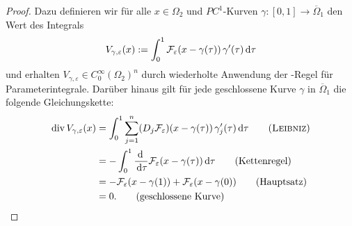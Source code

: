 \begin{proof}
  Dazu definieren wir für alle $x\in\Omega_2$ und $PC^1$\hyp{}Kurven $\gamma \colon [0,1] \to \overline\Omega_1$ den Wert des Integrals
  $$
  V_{\gamma,\varepsilon}(x) := \int_0^1 \mathcal{F}_\varepsilon(x - \gamma(\tau)) \, \gamma'(\tau)\, {\operatorname{d}\!{\tau}}
  $$
  und erhalten $V_{\gamma,\varepsilon} \in C_0^\infty(\Omega_2)^n$ durch wiederholte Anwendung der \leibniz\hyp{}Regel für Parameterintegrale.
  Darüber hinaus gilt für jede geschlossene Kurve $\gamma$ in $\overline\Omega_1$ die folgende Gleichungskette:
  \begingroup
  \addtolength{\jot}{0.5em}
  \begin{align*}
    \div V_{\gamma,\varepsilon}(x) 
    &= \int_0^1 \sum_{j=1}^n (D_j \mathcal{F}_\varepsilon)(x - \gamma(\tau)) \, \gamma_j'(\tau) \d\tau \tag{\leibniz}\\
    &= -\int_0^1 \frac{\d\ }{\d\tau}\mathcal{F}_\varepsilon(x - \gamma(\tau)) \d\tau \tag{Kettenregel}\\
    &= - \mathcal{F}_\varepsilon(x - \gamma(1)) + \mathcal{F}_\varepsilon(x - \gamma(0)) \tag{Hauptsatz}\\
    &= 0. \tag{geschlossene Kurve}
  \end{align*}
  \endgroup


\end{proof}
